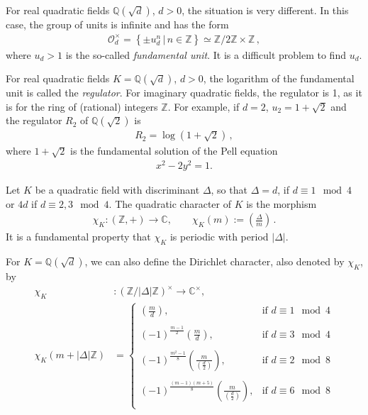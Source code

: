 \documentclass[reqno]{amsart}
\theoremstyle{plain}
\theoremstyle{definition}
\theoremstyle{remark}
\numberwithin{equation}{section}
\begin{document}
For real quadratic fields ${{\mathbb Q}}(\sqrt d)$, $d>0$, the situation is very
different. In this case, the group of units is infinite and has the
form
\begin{align*}
  {{\mathcal O}}_d^\times = \left\{ \pm u_d^n\,\big|\, n\in{{\mathbb Z}}\right\}\simeq {{\mathbb Z}}/2{{\mathbb Z}}\times{{\mathbb Z}}\,,
\end{align*}
where $u_d>1$ is the so-called {\em fundamental unit}. It is a
difficult problem to find $u_d$.

For real quadratic fields $K={{\mathbb Q}}(\sqrt d)$, $d>0$, the logarithm of the
fundamental unit is called the {\em regulator}. For imaginary quadratic
fields, the regulator is 1, as it is for the ring of (rational)
integers ${{\mathbb Z}}$. For example, if $d=2$, $u_2 = 1+\sqrt 2$ and the
regulator $R_2$ of ${{\mathbb Q}}(\sqrt 2)$ is
\begin{align*}
  R_2 = \log(1+\sqrt 2)\,,
\end{align*}
where $1+\sqrt 2$ is the fundamental solution of the Pell equation
\begin{align*}
  x^2 - 2y^2 =1.
\end{align*}

Let $K$ be a quadratic field with discriminant $\Delta$, so that
$\Delta = d$, if $d\equiv 1\mod 4$ or $4d$ if $d\equiv 2,3\mod 4$. The
quadratic character of $K$ is the morphism
\begin{align*}
  \chi_K:({{\mathbb Z}},+)\to{{\mathbb C}},\qquad \chi_K(m):=\left(\frac{\Delta}{m}\right)\,.
\end{align*}
It is a fundamental property that $\chi_K$ is periodic with period $|\Delta|$.

For $K={{\mathbb Q}}(\sqrt d)$, we can also define the Dirichlet character, also
denoted by $\chi_K$, by
\begin{align*}
  \chi_K&:\left({{\mathbb Z}}\big/|\Delta|{{\mathbb Z}}\right)^\times\to{{\mathbb C}}^\times,\\
  \chi_K\left(m+|\Delta|{{\mathbb Z}}\right)&=\left\{
    \begin{array}{ll}
     \left(\frac{m}{d}\right), & \text{if } d\equiv 1\mod 4\\
      \,\\
     (-1)^{\frac{m-1}{2}}\left(\frac{m}{d}\right), & \text{if } d\equiv 3\mod 4\\
      \,\\
  (-1)^{\frac{m^2-1}{8}}\left(\frac{m}{\left(\frac{d}{2}\right)}\right), & \text{if } d\equiv 2\mod 8\\
      \,\\
  (-1)^{\frac{(m-1)(m+5)}{8}}\left(\frac{m}{\left(\frac{d}{2}\right)}\right), & \text{if } d\equiv 6\mod 8\\
    \end{array}\right.
\end{align*}
\end{document}
